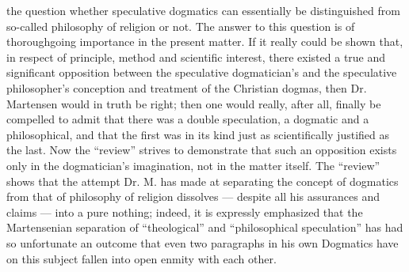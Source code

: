 \documentclass[12pt,a4paper,openany]{book}
\newcommand{\opage}[1]{\marginnote{\footnotesize\textit{[#1]}}}
\begin{document}
the question whether speculative dogmatics can essentially
be distinguished from so-called philosophy of religion
or not. The answer to this question is of thoroughgoing
importance in the present matter. If it really could
be shown that, in respect of principle, method and scientific
interest, there existed a true and significant opposition
between the speculative dogmatician's and the speculative
philosopher's conception and treatment of the Christian
dogmas, then Dr. Martensen would in truth be right; then
one would really, after all, finally be compelled to admit that there
was a double speculation, a dogmatic and a philosophical,
and that the first was in its kind just as scientifically
justified as the last. Now the ``review'' strives to demonstrate
that such an opposition exists only in the dogmatician's
imagination, not in the matter itself. The ``review'' shows
that the attempt Dr. M. has made at separating the concept of dogmatics
from that of philosophy of religion dissolves --- despite
all his assurances and claims --- into a pure nothing;
indeed, it is expressly emphasized that the Martensenian separation of
\setcounter{footnote}{0}%
\opage{51}``theological'' and ``philosophical speculation'' has had so
unfortunate an outcome that even two paragraphs in his
own Dogmatics have on this subject fallen into open
enmity with each other.
\end{document}
